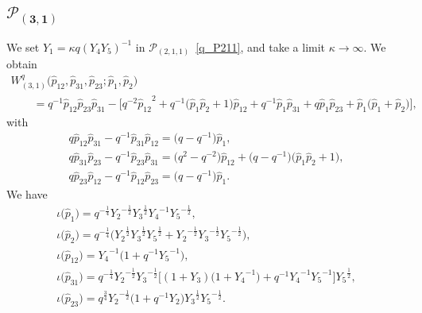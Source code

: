\documentclass[10pt,a4paper]{amsart}
\numberwithin{equation}{section}
\begin{document}
\subsection[$\mathcal{P}_{(3,1)}$]{$\boldsymbol{\mathcal{P}_{(3,1)}}$}
We set $Y_1 = \kappa q (Y_4 Y_5)^{-1}$ in $\mathcal{P}_{(2,1,1)}$~\eqref{q_P211}, and take a limit $\kappa\to\infty$. We obtain
\begin{gather*}
 W^q_{(3,1)}\big(\hat{p}_{12}, \hat{p}_{31}, \hat{p}_{23} ; \hat{p}_1, \hat{p}_2\big) \\
\qquad{} = q^{-1} \hat{p}_{12} \hat{p}_{23} \hat{p}_{31} - \big[ q^{-2} {\hat{p}_{12}}^{2} + q^{-1} \big( \hat{p}_1 \hat{p}_2 + 1 \big) \hat{p}_{12} + q^{-1} \hat{p}_1 \hat{p}_{31} + q \hat{p}_1 \hat{p}_{23}
 + \hat{p}_1 \big( \hat{p}_1 + \hat{p}_2 \big) \big],
\end{gather*}
with
\begin{gather*}
q \hat{p}_{12} \hat{p}_{31} - q^{-1} \hat{p}_{31} \hat{p}_{12} = \big(q - q^{-1} \big) \hat{p}_1 , \\
q \hat{p}_{31} \hat{p}_{23} - q^{-1} \hat{p}_{23} \hat{p}_{31} = \big( q^2 - q^{-2} \big) \hat{p}_{12} + \big(q-q^{-1}\big) \big( \hat{p}_1 \hat{p}_2 + 1 \big) , \\
q \hat{p}_{23} \hat{p}_{12} - q^{-1} \hat{p}_{12} \hat{p}_{23} = \big( q-q^{-1} \big) \hat{p}_1 .
\end{gather*}
We have
\begin{gather}
\iota\big(\hat{p}_1\big) = q^{-\frac{1}{4}} {Y_2}^{-\frac{1}{2}} {Y_3}^{\frac{1}{2}} {Y_4}^{-1} {Y_5}^{-\frac{1}{2}} , \nonumber\\
 \iota\big(\hat{p}_2\big) = q^{-\frac{1}{4}} \big( {Y_2}^{\frac{1}{2}} {Y_3}^{\frac{1}{2}} {Y_5}^{\frac{1}{2}} + {Y_2}^{-\frac{1}{2}} {Y_3}^{-\frac{1}{2}} {Y_5}^{-\frac{1}{2}} \big), \nonumber\\
 \iota\big(\hat{p}_{12}\big) = {Y_4}^{-1} \big( 1 + q^{-1} {Y_5}^{-1} \big) ,\nonumber \\
 \iota\big(\hat{p}_{31}\big) = q^{-\frac{1}{4}} {Y_2}^{-\frac{1}{2}} {Y_3}^{-\frac{1}{2}} \big[ ( 1+Y_3)\big(1+ {Y_4}^{-1} \big) + q^{-1} {Y_4}^{-1} {Y_5}^{-1} \big] {Y_5}^{\frac{1}{2}} ,\nonumber \\
 \iota\big(\hat{p}_{23}\big) = q^{\frac{3}{4}} {Y_2}^{-\frac{1}{2}} \big( 1 + q^{-1} Y_2 \big) {Y_3}^{\frac{1}{2}} {Y_5}^{-\frac{1}{2}} . \label{q_P31}
\end{gather}
\end{document}
